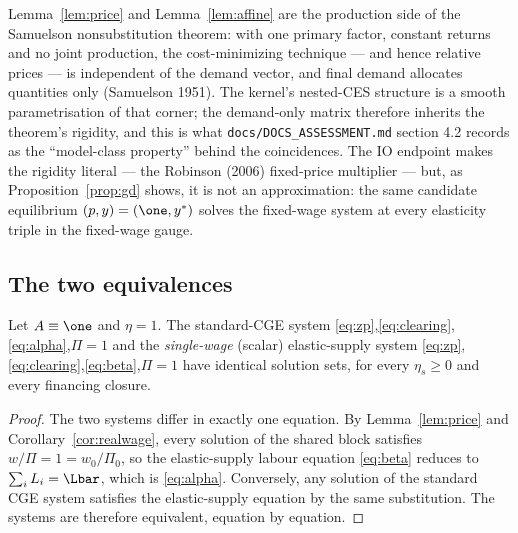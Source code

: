 \begin{remark}[Nonsubstitution]\label{rem:samuelson}
Lemma~\ref{lem:price} and Lemma~\ref{lem:affine} are the production side of
the Samuelson nonsubstitution theorem: with one primary factor, constant
returns and no joint production, the cost-minimizing technique --- and hence
relative prices --- is independent of the demand vector, and final demand
allocates quantities only (Samuelson 1951). The kernel's nested-CES
structure is a smooth parametrisation of that corner; the demand-only matrix
therefore inherits the theorem's rigidity, and this is what
\texttt{docs/DOCS\_ASSESSMENT.md} section 4.2 records as the ``model-class
property'' behind the coincidences. The IO endpoint makes the rigidity
literal --- the Robinson (2006) fixed-price multiplier --- but, as
Proposition~\ref{prop:gd} shows, it is not an approximation:
the same candidate equilibrium $(p,y)=(\one,y^{\ast})$
solves the fixed-wage system at every elasticity triple in the fixed-wage
gauge.
\end{remark}

\subsection{The two equivalences}\label{sec:equiv}

\begin{proposition}\label{prop:ab}
Let $A \equiv \one$ and $\eta = 1$. The standard-CGE system
\eqref{eq:zp},\eqref{eq:clearing},\eqref{eq:alpha},$\Pi = 1$ and the
\emph{single-wage} (scalar) elastic-supply system
\eqref{eq:zp},\eqref{eq:clearing},\eqref{eq:beta},$\Pi = 1$ have
identical solution sets, for every $\eta_s \geq 0$ and every financing
closure.
\end{proposition}

\begin{proof}
The two systems differ in exactly one equation. By
Lemma~\ref{lem:price} and Corollary~\ref{cor:realwage}, every solution of
the shared block satisfies $w/\Pi = 1 = w_0/\Pi_0$, so the elastic-supply
labour
equation \eqref{eq:beta} reduces to $\sum_i L_i = \Lbar$, which is
\eqref{eq:alpha}. Conversely, any solution of the standard CGE system
satisfies the elastic-supply equation by the same substitution. The systems
are therefore
equivalent, equation by equation.
\end{proof}

